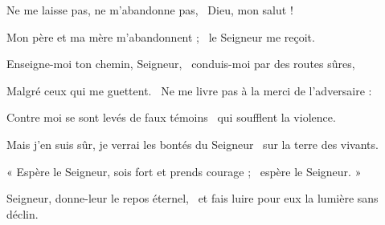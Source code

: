\item Ne me laisse pas, ne m'abandonne pas,~\psstar{} Dieu, mon salut !

\item Mon père et ma mère m'abandonnent ;~\psstar{} le Seigneur me reçoit.

\item Enseigne-moi ton chemin, Seigneur,~\psstar{} conduis-moi par des routes sûres,

\item Malgré ceux qui me guettent.~\psstar{} Ne me livre pas à la merci de l'adversaire :

\item Contre moi se sont levés de faux témoins~\psstar{} qui soufflent la violence.

\item Mais j'en suis sûr, je verrai les bontés du Seigneur~\psstar{} sur la terre des vivants.~\psstar{}

\item « Espère le Seigneur, sois fort et prends courage ;~\psstar{} espère le Seigneur. »

\item Seigneur, donne-leur le repos éternel,~\psstar{} et fais luire pour eux la lumière sans déclin.